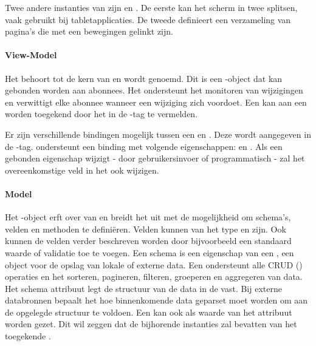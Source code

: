 Twee andere instanties van  zijn  en .
De eerste kan het scherm in twee  splitsen,  vaak gebruikt bij tabletapplicaties.
De tweede definieert een verzameling van pagina's die met een  bewegingen gelinkt zijn.

\paragraph{View-Model}
Het  behoort tot de kern van \kendo{} en wordt  genoemd.
Dit is een \js{}-object dat kan gebonden worden aan abonnees.
Het ondersteunt het monitoren van wijzigingen en verwittigt elke abonnee wanneer een wijziging zich voordoet.
Een  kan aan een  worden toegekend door het in de -tag te vermelden.

Er zijn verschillende bindingen	 mogelijk tussen een  en .
Deze wordt aangegeven in de -tag.
\kendo{} ondersteunt een binding met volgende eigenschappen:   en .
Als een gebonden eigenschap wijzigt - door gebruikersinvoer of programmatisch - zal het overeenkomstige veld in het  ook wijzigen.

\paragraph{Model}
Het -object erft over van  en breidt het uit met de mogelijkheid om schema's,  velden en methoden te definiëren.  
Velden kunnen van het type  en  zijn.
Ook kunnen de velden verder beschreven worden door bijvoorbeeld een standaard waarde of validatie toe te voegen.
Een schema is een eigenschap van een ,  een \kendo{} object voor de opslag van lokale of externe data.  
Een  ondersteunt alle CRUD () operaties en het sorteren, pagineren, filteren, groeperen en aggregeren van data.
Het schema attribuut legt de structuur van de data in de  vast.
Bij externe databronnen bepaalt het hoe binnenkomende data geparset moet worden om aan de opgelegde structuur te voldoen.
Een  kan ook als waarde van het attribuut worden gezet.
Dit wil zeggen dat de bijhorende  instanties zal bevatten van het toegekende .


